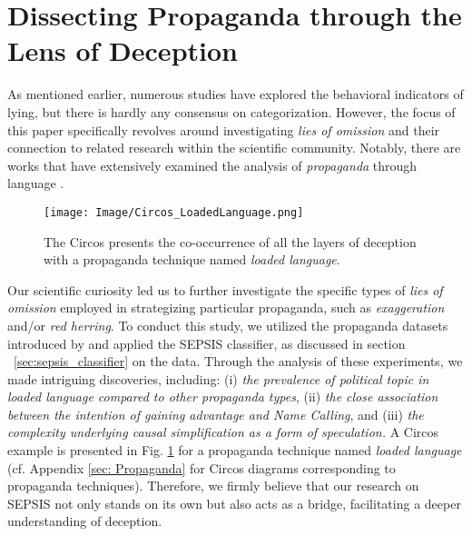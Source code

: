 \vspace{-3mm}
\section{Dissecting Propaganda through the Lens of Deception}
\vspace{-1.5mm}
As mentioned earlier, numerous studies have explored the behavioral indicators of lying, but there is hardly any consensus on categorization. However, the focus of this paper specifically revolves around investigating \emph{lies of omission} and their connection to related research within the scientific community. Notably, there are works that have extensively examined the analysis of \emph{propaganda} through language \cite{da-san-martino-etal-2019-fine,martino2020survey}.

\begin{figure}[h]
\vspace{-3mm}  
\centering
  \centering
\texttt{[image: Image/Circos\_LoadedLanguage.png]}
\vspace{-1.5mm}
  \caption{The Circos presents the co-occurrence of all the layers of deception with a propaganda technique named \emph{loaded language}.}
  \label{fig:loaded_language}
\vspace{-4mm}  
\end{figure}

Our scientific curiosity led us to further investigate the specific types of \emph{lies of omission} employed in strategizing particular propaganda, such as \textit{exaggeration} and/or \textit{red herring}. To conduct this study, we utilized the propaganda datasets introduced by \cite{da-san-martino-etal-2019-fine} and applied the SEPSIS classifier, as discussed in section ~\ref{sec:sepsis_classifier} on the data. Through the analysis of these experiments, we made intriguing discoveries, including: (i) \emph{the prevalence of political topic in loaded language compared to other propaganda types}, (ii) \emph{the close association between the intention of gaining advantage and Name Calling}, and (iii) \emph{the complexity underlying causal simplification as a form of speculation.} A Circos \cite{Flourish} example is presented in Fig. \ref{fig:loaded_language} for a propaganda technique named
\textit{loaded language} (cf. Appendix \ref{sec: Propaganda} for Circos diagrams corresponding to propaganda techniques). Therefore, we firmly believe that our research on SEPSIS not only stands on its own but also acts as a bridge, facilitating a deeper understanding of deception. 


